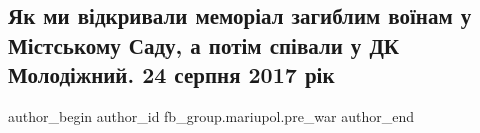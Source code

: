  
 
 
 
 

\subsection{Як ми відкривали меморіал загиблим воїнам у Містському Саду, а потім співали у ДК Молодіжний. 24 серпня 2017 рік}
\label{sec:18_02_2023.fb.fb_group.mariupol.pre_war.4.yak_mi_v_dkrivali_me}

\ifcmt
 author_begin
   author_id fb_group.mariupol.pre_war
 author_end
\fi
